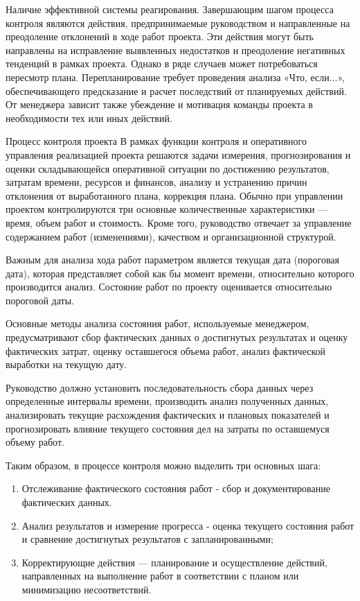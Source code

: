 Наличие эффективной системы реагирования.
Завершающим шагом процесса контроля являются действия, предпринимаемые руководством и направленные на преодоление отклонений в ходе работ проекта.
Эти действия могут быть направлены на исправление выявленных недостатков и преодоление негативных тенденций в рамках проекта.
Однако в ряде случаев может потребоваться пересмотр плана.
Перепланирование требует проведения анализа «Что, если...», обеспечивающего предсказание и расчет последствий от планируемых действий.
От менеджера зависит также убеждение и мотивация команды проекта в необходимости тех или иных действий.

Процесс контроля проекта
В рамках функции контроля и оперативного управления реализацией проекта решаются задачи измерения, прогнозирования и оценки складывающейся оперативной ситуации по достижению результатов, затратам времени, ресурсов и финансов, анализу и устранению причин отклонения от выработанного плана, коррекция плана.
Обычно при управлении проектом контролируются три основные количественные характеристики --- время, объем работ и стоимость.
Кроме того, руководство отвечает за управление содержанием работ (изменениями), качеством и организационной структурой.

Важным для анализа хода работ параметром является текущая дата (пороговая дата), которая представляет собой как бы момент времени, относительно которого производится анализ.
Состояние работ по проекту оценивается относительно пороговой даты.

Основные методы анализа состояния работ, используемые менеджером, предусматривают сбор фактических данных о достигнутых результатах и оценку фактических затрат, оценку оставшегося объема работ, анализ фактической выработки на текущую дату.

Руководство должно установить последовательность сбора данных через определенные интервалы времени, производить анализ полученных данных, анализировать текущие расхождения фактических и плановых показателей и прогнозировать влияние текущего состояния дел на затраты по оставшемуся объему работ.

Таким образом, в процессе контроля можно выделить три основных шага:

\begin{enumerate}
	\item Отслеживание фактического состояния работ - сбор и документирование фактических данных.
	\item Анализ результатов и измерение прогресса - оценка текущего состояния работ и сравнение достигнутых результатов с запланированными;
	\item Корректирующие действия --- планирование и осуществление действий, направленных на выполнение работ в соответствии с планом или минимизацию несоответствий.
\end{enumerate}

